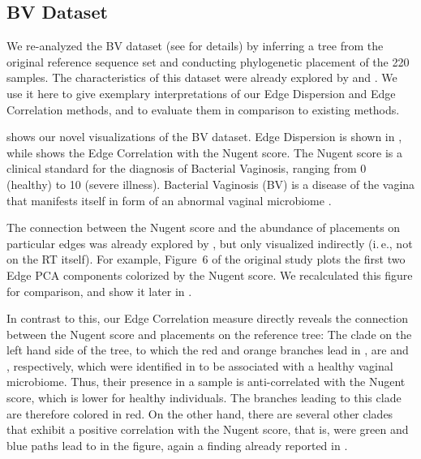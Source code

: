 \subsection{BV Dataset}
\label{ch:Visualization:sec:Results:sub:BVDataset}

We re-analyzed the \acf{BV} dataset (see  for details)
by inferring a tree from the original reference sequence set
and conducting phylogenetic placement of the \num{220} samples.
The characteristics of this dataset were already explored by  and .
We use it here to give exemplary interpretations of our Edge Dispersion and Edge Correlation methods,
and to evaluate them in comparison to existing methods.

 shows our novel visualizations of the \ac{BV} dataset.
Edge Dispersion is shown in ,
while  shows the Edge Correlation with the Nugent score. %
The Nugent score \cite{Nugent1991} is a clinical standard for the diagnosis of Bacterial Vaginosis,
ranging from \num{0} (healthy) to \num{10} (severe illness).
Bacterial Vaginosis (BV) is a disease of the vagina
that manifests itself in form of an abnormal vaginal microbiome \cite{Srinivasan2012}.

The connection between the Nugent score and the abundance of placements on particular edges
was already explored by , but only visualized indirectly (i.\,e., not on the \ac{RT} itself).
For example, Figure~6 of the original study \cite{Matsen2011a}
plots the first two Edge PCA components colorized by the Nugent score.
We recalculated this figure for comparison, and show it later in .

In contrast to this, our Edge Correlation measure directly reveals
the connection between the Nugent score and placements on the reference tree:
The clade on the left hand side of the tree, to which the red and orange branches lead in ,
are  and , respectively,
which were identified in  to be associated with a healthy vaginal microbiome.
Thus, their presence in a sample is anti-correlated with the Nugent score, which is lower for healthy individuals.
The branches leading to this clade are therefore colored in red.
On the other hand, there are several other clades that exhibit a positive correlation with the Nugent score,
that is, were green and blue paths lead to in the figure,
again a finding already reported in .


